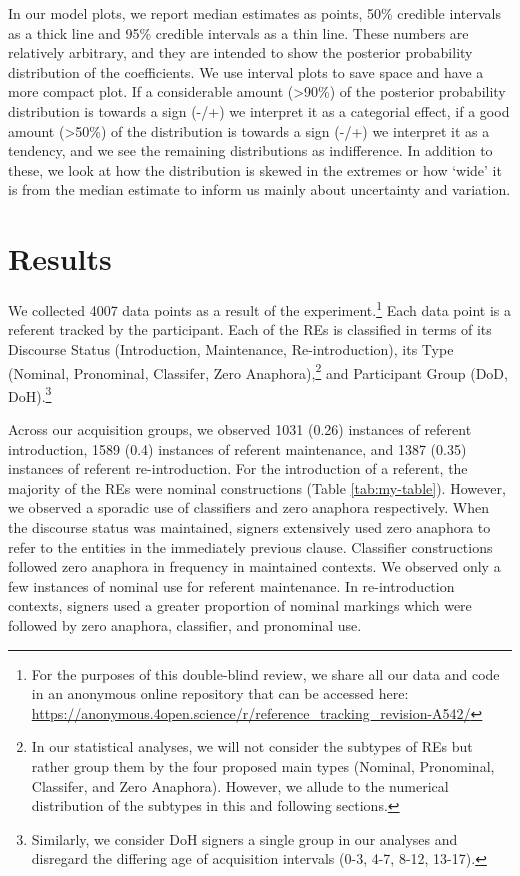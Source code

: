 \documentclass[review]{elsarticle} %
\begin{document}
In our model plots, we report median estimates as points, 50\% credible
intervals as a thick line and 95\% credible intervals as a thin line.
These numbers are relatively arbitrary, and they are intended to show
the posterior probability distribution of the coefficients. We use
interval plots to save space and have a more compact plot. If a
considerable amount (\textgreater90\%) of the posterior probability
distribution is towards a sign (-/+) we interpret it as a categorial
effect, if a good amount (\textgreater50\%) of the distribution is
towards a sign (-/+) we interpret it as a tendency, and we see the
remaining distributions as indifference. In addition to these, we look
at how the distribution is skewed in the extremes or how `wide' it is
from the median estimate to inform us mainly about uncertainty and
variation.

\hypertarget{results}{%
\section{Results}\label{results}}

We collected 4007 data points as a result of the
experiment.\footnote{For the purposes of this double-blind review, we share all our data and code in an anonymous online repository that can be accessed here: \url{https://anonymous.4open.science/r/reference_tracking_revision-A542/}}
Each data point is a referent tracked by the participant. Each of the
REs is classified in terms of its Discourse Status (Introduction,
Maintenance, Re-introduction), its Type (Nominal, Pronominal, Classifer,
Zero
Anaphora),\footnote{In our statistical analyses, we will not consider the subtypes of REs but rather group them by the four proposed main types (Nominal, Pronominal, Classifer, and Zero Anaphora). However, we allude to the numerical distribution of the subtypes in this and following sections.}
and Participant Group (DoD,
DoH).\footnote{Similarly, we consider DoH signers a single group in our analyses and disregard the differing age of acquisition intervals (0-3, 4-7, 8-12, 13-17).}

Across our acquisition groups, we observed 1031 (0.26) instances of
referent introduction, 1589 (0.4) instances of referent maintenance, and
1387 (0.35) instances of referent re-introduction. For the introduction
of a referent, the majority of the REs were nominal constructions (Table
\ref{tab:my-table}). However, we observed a sporadic use of classifiers
and zero anaphora respectively. When the discourse status was
maintained, signers extensively used zero anaphora to refer to the
entities in the immediately previous clause. Classifier constructions
followed zero anaphora in frequency in maintained contexts. We observed
only a few instances of nominal use for referent maintenance. In
re-introduction contexts, signers used a greater proportion of nominal
markings which were followed by zero anaphora, classifier, and
pronominal use.
\end{document}
